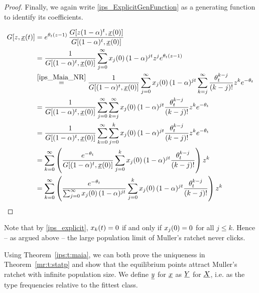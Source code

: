 \begin{proof}
\noindent
Finally, we again write \eqref{ips_ExplicitGenFunction} as a generating
function to identify its coefficients.

{\allowdisplaybreaks
\begin{align*}
G[z,\mrIpsT{t}] & = e^{\theta_t (z-1)} \,
\frac{G[z(1-\alpha)^t,\mrIpsT{0}]}{G[(1-\alpha)^t,\mrIpsT{0}]} \\ 
& = \frac{1}{G[(1-\alpha)^t,\mrIpsT{0}]} \sum_{j=0}^\infty \mrIpsKT{j}{0} (1-\alpha)^{j t} z^j
e^{\theta_t (z-1)} \\
& \stackrel{\eqref{ips_Maia_NR}}{=}
\frac{1}{G[(1-\alpha)^t,\mrIpsT{0}]} \sum_{j=0}^\infty \mrIpsKT{j}{0} (1-\alpha)^{j t}
\sum_{k=j}^\infty \frac{\theta_t^{k-j}}{(k-j)!} z^k e^{-\theta_t} \\
& = \frac{1}{G[(1-\alpha)^t,\mrIpsT{0}]} \sum_{j=0}^\infty \sum_{k=j}^\infty \mrIpsKT{j}{0}
(1-\alpha)^{j t} \frac{\theta_t^{k-j}}{(k-j)!} z^k e^{-\theta_t} \\
& = \frac{1}{G[(1-\alpha)^t,\mrIpsT{0}]} \sum_{k=0}^\infty \sum_{j=0}^k \mrIpsKT{j}{0}
(1-\alpha)^{j t} \frac{\theta_t^{k-j}}{(k-j)!} z^k e^{-\theta_t} \\
& = \sum_{k=0}^\infty \left( \frac{e^{-\theta_t}}{G[(1-\alpha)^t,\mrIpsT{0}]}  \sum_{j=0}^k
\mrIpsKT{j}{0} (1-\alpha)^{j t} \frac{\theta_t^{k-j}}{(k-j)!} \right) z^k \\
& = \sum_{k=0}^\infty \left( \frac{e^{-\theta_t}}{\sum_{j=0}^\infty
\mrIpsKT{j}{0} (1-\alpha)^{j t}}  \sum_{j=0}^k
\mrIpsKT{j}{0} (1-\alpha)^{j t} \frac{\theta_t^{k-j}}{(k-j)!} \right) z^k \qedhere
\end{align*} }
\end{proof}

\noindent
Note that by \eqref{ips_explicit}, $x_{k} \! \left( t \right) = 0$ if and only if $x_{j} \! \left( 0 \right) = 0$ for all
$j \leq k$. Hence -- as argued above -- the large population limit of Muller's ratchet never clicks.

Using Theorem~\ref{ips:t:maia}, we can both prove the uniqueness in Theorem~\ref{mr:t:statp} and show that
the equilibrium points attract Muller's ratchet with infinite population size.  We define
$\underline{y}$ for $\underline{x}$ as $\underline{Y}$ for $\underline{X}$, i.e. as the type frequencies relative to the fittest
class.

